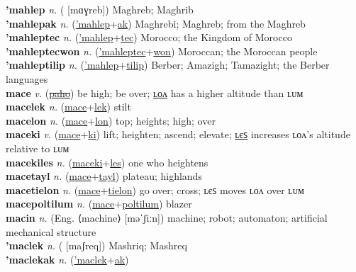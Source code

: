 \textbf{'mahlep} \textit{n.} ( [mɑɣreb])
Maghreb; Maghrib \label{'mahlep} \\
\textbf{'mahlepak} \textit{n.} (\hyperref['mahlep]{'mahlep}+\hyperref[ak]{ak})
Maghrebi; Maghreb; from the Maghreb \label{'mahlepak} \\
\textbf{'mahleptec} \textit{n.} (\hyperref['mahlep]{'mahlep}+\hyperref[tec]{tec})
Morocco; the Kingdom of Morocco \label{'mahleptec} \\
\textbf{'mahleptecwon} \textit{n.} (\hyperref['mahleptec]{'mahleptec}+\hyperref[won]{won})
Moroccan; the Moroccan people \label{'mahleptecwon} \\
\textbf{'mahleptilip} \textit{n.} (\hyperref['mahlep]{'mahlep}+\hyperref[tilip]{tilip})
Berber; Amazigh; Tamazight; the Berber languages \label{'mahleptilip} \\
\textbf{mace} \textit{v.} (\hyperref[paho]{\sout{paho}})
be high; be over; \hyperref[macelon]{ʟᴏᴧ} has a higher altitude than ʟᴜᴍ \label{mace} \\
\textbf{macelek} \textit{n.} (\hyperref[mace]{mace}+\hyperref[lek]{lek})
stilt \label{macelek} \\
\textbf{macelon} \textit{n.} (\hyperref[mace]{mace}+\hyperref[lon]{lon})
top; heights; high; over \label{macelon} \\
\textbf{maceki} \textit{v.} (\hyperref[mace]{mace}+\hyperref[ki]{ki})
lift; heighten; ascend; elevate; \hyperref[macekiles]{ʟєꜱ} increases ʟᴏᴧ’s altitude relative to ʟᴜᴍ \label{maceki} \\
\textbf{macekiles} \textit{n.} (\hyperref[maceki]{maceki}+\hyperref[les]{les})
one who heightens \label{macekiles} \\
\textbf{macetayl} \textit{n.} (\hyperref[mace]{mace}+\hyperref[tayl]{tayl})
plateau; highlands \label{macetayl} \\
\textbf{macetielon} \textit{n.} (\hyperref[mace]{mace}+\hyperref[tielon]{tielon})
go over; cross; ʟєꜱ moves ʟᴏᴧ over ʟᴜᴍ \label{macetielon} \\
\textbf{macepoltilum} \textit{n.} (\hyperref[mace]{mace}+\hyperref[poltilum]{poltilum})
blazer \label{macepoltilum} \\
\textbf{macin} \textit{n.} (Eng. ⟨machine⟩ [məˈʃiːn])
machine; robot; automaton; artificial mechanical structure \label{macin} \\
\textbf{'maclek} \textit{n.} ( [maʃreq])
Mashriq; Mashreq \label{'maclek} \\
\textbf{'maclekak} \textit{n.} (\hyperref['maclek]{'maclek}+\hyperref[ak]{ak})
